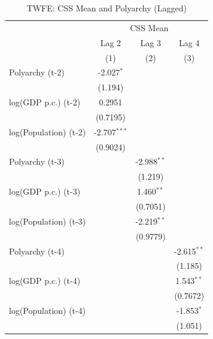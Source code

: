 
\begin{table}[htbp]
   \caption{\label{tab:twfe_polyarchy} TWFE: CSS Mean and Polyarchy (Lagged)}
   \bigskip
   \centering
   \begin{tabular}{lccc}
      \toprule
       & \multicolumn{3}{c}{CSS Mean}\\
                            & Lag 2          & Lag 3         & Lag 4 \\   
                            & (1)            & (2)           & (3)\\  
      \midrule 
      Polyarchy (t-2)       & -2.027$^{*}$   &               &   \\   
                            & (1.194)        &               &   \\   
      log(GDP p.c.) (t-2)   & 0.2951         &               &   \\   
                            & (0.7195)       &               &   \\   
      log(Population) (t-2) & -2.707$^{***}$ &               &   \\   
                            & (0.9024)       &               &   \\   
      Polyarchy (t-3)       &                & -2.988$^{**}$ &   \\   
                            &                & (1.219)       &   \\   
      log(GDP p.c.) (t-3)   &                & 1.460$^{**}$  &   \\   
                            &                & (0.7051)      &   \\   
      log(Population) (t-3) &                & -2.219$^{**}$ &   \\   
                            &                & (0.9779)      &   \\   
      Polyarchy (t-4)       &                &               & -2.615$^{**}$\\   
                            &                &               & (1.185)\\   
      log(GDP p.c.) (t-4)   &                &               & 1.543$^{**}$\\   
                            &                &               & (0.7672)\\   
      log(Population) (t-4) &                &               & -1.853$^{*}$\\   
                            &                &               & (1.051)\\   

\end{tabular}
\end{table}
